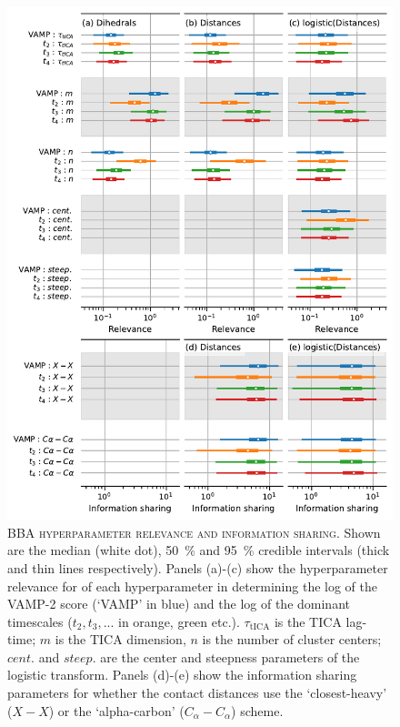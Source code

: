 \documentclass{article}
\begin{document}
\begin{figure}[h]
    \centering
    \includegraphics[height=0.8\textheight]{figures/sensitivities/1fme_sensitivity.pdf}
    \caption{\textsc{BBA hyperparameter relevance and information sharing}. Shown are the  median (white dot), \SI{50}{\percent} and \SI{95}{\percent} credible intervals (thick and thin lines respectively).  Panels (a)-(c) show the hyperparameter relevance for of each hyperparameter in determining the log of the VAMP-2 score (`VAMP' in blue) and the log of the dominant timescales ($t_{2}, t_{3}, ...$ in orange, green etc.). $\tau_{\mathrm{tICA}}$ is the TICA lag-time; $m$ is the TICA dimension, $n$ is the number of cluster centers; $cent.$ and $steep.$ are the center and steepness parameters of the logistic transform. Panels (d)-(e) show the information sharing parameters for whether the contact distances use the `closest-heavy' ($X-X$) or the `alpha-carbon' ($C_{\alpha}-C_{\alpha}$) scheme.}
    \label{fig:1fme_sense}
\end{figure}
\end{document}

